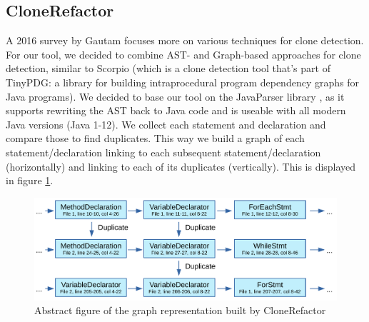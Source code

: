 \documentclass[a4paper]{article}
\begin{document}
\subsection{CloneRefactor}
A 2016 survey by Gautam \cite{gautam2016various} focuses more on various techniques for clone detection. For our tool, we decided to combine AST- and Graph-based approaches for clone detection, similar to Scorpio (which is a clone detection tool that's part of TinyPDG: a library for building intraprocedural program dependency graphs for Java programs). We decided to base our tool on the JavaParser library \cite{tomassetti2017javaparser}, as it supports rewriting the AST back to Java code and is useable with all modern Java versions (Java 1-12). We collect each statement and declaration and compare those to find duplicates. This way we build a graph of each statement/declaration linking to each subsequent statement/declaration (horizontally) and linking to each of its duplicates (vertically). This is displayed in figure \ref{fig:clonerefactor}.

\begin{figure}[H]
  \includegraphics[width=1\columnwidth]{img/CodeGraph}
  \caption{Abstract figure of the graph representation built by CloneRefactor}
  \label{fig:clonerefactor}
\end{figure}
\end{document}
